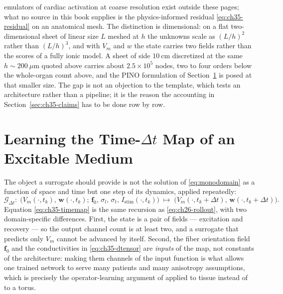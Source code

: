 emulators of cardiac activation at coarse resolution exist outside these pages;
what no source in this book supplies is the physics-informed residual
\eqref{eq:ch35-residual} on an anatomical mesh.
The distinction is dimensional: on a flat two-dimensional sheet of linear size
$L$ meshed at $h$ the unknowns scale as $(L/h)^2$ rather than $(L/h)^3$, and with
$V_m$ and $w$ the state carries two fields rather than the scores of a fully
ionic model. A sheet of side $10\ \text{cm}$ discretized at the same
$h\sim200\ \mu\text{m}$ quoted above carries about $2.5\times10^{5}$ nodes, two to four orders
below the whole-organ count above, and the PINO formulation
\cite{li2021physics} of Section~\ref{sec:ch35-map} is posed at that smaller size.
The gap is not an
objection to the template, which tests an architecture rather than a pipeline; it
is the reason the accounting in Section~\ref{sec:ch35-claims} has to be done row
by row.

\section{\texorpdfstring{Learning the Time-$\Delta t$ Map of an Excitable Medium}{Learning the Time-Delta t Map of an Excitable Medium}}
\label{sec:ch35-map}

The object a surrogate should provide is not the solution of
\eqref{eq:monodomain} as a function of space and time but one step of its
dynamics, applied repeatedly:
\begin{equation}
  \label{eq:ch35-timemap}
  \mathcal{G}_{\Delta t}:\;
  \big(V_m(\cdot,t_k),\,\mathbf{w}(\cdot,t_k);\,\mathbf{f}_0,\,\sigma_l,\,\sigma_t,\,I_{\text{stim}}(\cdot,t_k)\big)
  \;\longmapsto\;
  \big(V_m(\cdot,t_k+\Delta t),\,\mathbf{w}(\cdot,t_k+\Delta t)\big).
\end{equation}
Equation \eqref{eq:ch35-timemap} is the same recursion as \eqref{eq:ch26-rollout},
with two domain-specific
differences. First, the state is a pair of fields --- excitation and
recovery --- so the output channel count is at least two, and a surrogate that
predicts only $V_m$ cannot be advanced by itself. Second, the fiber orientation
field $\mathbf{f}_0$ and the conductivities in \eqref{eq:ch35-dtensor} are
\emph{inputs} of the map, not constants of the architecture: making them channels
of the input function is what allows one trained network to serve many patients
and many anisotropy assumptions, which is precisely the operator-learning
argument of 
applied to tissue instead of to a torus.


